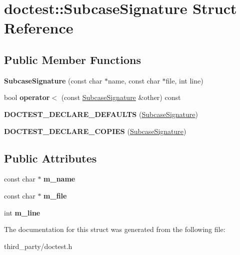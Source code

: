 \hypertarget{structdoctest_1_1_subcase_signature}{}\section{doctest\+::Subcase\+Signature Struct Reference}
\label{structdoctest_1_1_subcase_signature}
\subsection*{Public Member Functions}
\begin{DoxyCompactItemize}
\item 
\mbox{\label{structdoctest_1_1_subcase_signature_af7390f9104611cb58c24f08b64716ee1}} 
{\bfseries Subcase\+Signature} (const char $\ast$name, const char $\ast$file, int line)
\item 
\mbox{\label{structdoctest_1_1_subcase_signature_a07364f9dddf615f51e15f09b994d4bef}} 
bool {\bfseries operator$<$} (const \mbox{\hyperlink{structdoctest_1_1_subcase_signature}{Subcase\+Signature}} \&other) const
\item 
\mbox{\label{structdoctest_1_1_subcase_signature_a4982f715beff70f9b234a0352bde07eb}} 
{\bfseries D\+O\+C\+T\+E\+S\+T\+\_\+\+D\+E\+C\+L\+A\+R\+E\+\_\+\+D\+E\+F\+A\+U\+L\+TS} (\mbox{\hyperlink{structdoctest_1_1_subcase_signature}{Subcase\+Signature}})
\item 
\mbox{\label{structdoctest_1_1_subcase_signature_a1b2fc90917bf07f7f0f8a3f3be2c4038}} 
{\bfseries D\+O\+C\+T\+E\+S\+T\+\_\+\+D\+E\+C\+L\+A\+R\+E\+\_\+\+C\+O\+P\+I\+ES} (\mbox{\hyperlink{structdoctest_1_1_subcase_signature}{Subcase\+Signature}})
\end{DoxyCompactItemize}
\subsection*{Public Attributes}
\begin{DoxyCompactItemize}
\item 
\mbox{\label{structdoctest_1_1_subcase_signature_a1d926e49b4fe9d29b3e3d736a1b3dc05}} 
const char $\ast$ {\bfseries m\+\_\+name}
\item 
\mbox{\label{structdoctest_1_1_subcase_signature_adc680b4597c89fb81ae8fed7fc41414d}} 
const char $\ast$ {\bfseries m\+\_\+file}
\item 
\mbox{\label{structdoctest_1_1_subcase_signature_a73fb5432d0f8b82ffbe262b86af5c643}} 
int {\bfseries m\+\_\+line}
\end{DoxyCompactItemize}


The documentation for this struct was generated from the following file\+:\begin{DoxyCompactItemize}
\item 
third\+\_\+party/doctest.\+h\end{DoxyCompactItemize}
